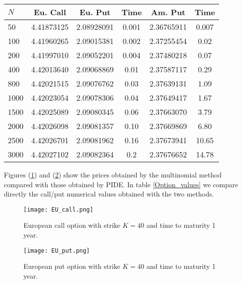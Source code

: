 \documentclass[]{interact}
\theoremstyle{plain}%
\theoremstyle{definition}
\theoremstyle{remark}
\begin{document}
\begin{table}[!h]
{\begin{tabular}{l|ccc|cc} \toprule
  $N$ & Eu. Call & Eu. Put & Time & Am. Put & Time \\
  \hline
    50 & 4.41873125 & 2.08928091 & 0.001 & 2.36765911 & 0.007 \\
    100 & 4.41960265 & 2.09015381 & 0.002 & 2.37255454 & 0.02 \\
    200 & 4.41997010 & 2.09052201 & 0.004 & 2.37480218 & 0.07 \\
    400 & 4.42013640 & 2.09068869 & 0.01 & 2.37587117 & 0.29 \\
    800 & 4.42021515 & 2.09076762 & 0.03 & 2.37639131 & 1.09 \\
    1000 & 4.42023054 & 2.09078306 & 0.04 & 2.37649417 & 1.67 \\
    1500 & 4.42025089 & 2.09080345 & 0.06 & 2.37663070 & 3.79 \\
    2000 & 4.42026098 & 2.09081357 & 0.10 & 2.37669869 & 6.80 \\
    2500 & 4.42026701 & 2.09081962 & 0.16 & 2.37673941 & 10.65 \\
    3000 & 4.42027102 & 2.09082364 & 0.2 & 2.37676652 & 14.78 \\
  \hline
\end{tabular}}
\label{Convergence}
\end{table}
Figures (\ref{figCall}) and (\ref{figPut}) show the prices obtained by the multinomial method compared with those obtained by PIDE.
In table \ref{Option_values} we compare directly the call/put numerical values obtained with the two methods.
\begin{figure}[t!]
 \centering
 \texttt{[image: EU\_call.png]}
 \caption{European call option with strike $K=40$ and time to maturity 1 year.}
 \label{figCall}
\end{figure}
\begin{figure}[t!]
 \centering
 \texttt{[image: EU\_put.png]}
 \caption{European put option with strike $K=40$ and time to maturity 1 year.}
 \label{figPut}
\end{figure}
\end{document}
